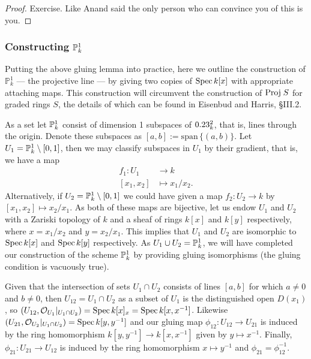 \begin{proof}
Exercise. Like Anand said the only person who can convince you of this is you.
\end{proof}

\subsubsection{Constructing $\P_k^1$}

Putting the above gluing lemma into practice, here we outline the construction of $\mathbb{P}_k^1$ --- the projective line --- by giving two copies of $\Spec k[x]$ with appropriate attaching maps. This construction will circumvent the construction of $\textnormal{Proj}\; S$ for graded rings $S$, the details of which can be found in Eisenbud and Harris, \S III.2.

As a set let $\P_k^1$ consist of dimension 1 subspaces of $\A_k^2$, that is, lines through the origin. Denote these subspaces as $[a,b] := \text{span}\, \{(a,b)\}$. Let $U_1 = \P_k^1 \setminus [0,1]$, then we may classify subspaces in $U_1$ by their gradient, that is, we have a map 
\begin{align*}
f_1 \colon U_1 &\to k\\
[x_1, x_2] &\mapsto x_1/x_2.
\end{align*}
Alternatively, if $U_2 = \P_k^1 \setminus [0,1]$ we could have given a map $f_2 \colon U_2 \to k$ by $[x_1, x_2] \mapsto x_2/x_1$. As both of these maps are bijective, let us endow $U_1$ and $U_2$ with a Zariski topology of $k$ and a sheaf of rings $k[x]$ and $k[y]$ respectively, where $x = x_1/x_2$ and $y = x_2/x_1$. This implies that $U_1$ and $U_2$ are isomorphic to $\Spec k[x]$ and $\Spec k[y]$ respectively. As $U_1 \cup U_2 = \P_k^1$, we will have completed our construction of the scheme $\P_k^1$ by providing gluing isomorphisms (the gluing condition is vacuously true).

Given that the intersection of sets $U_1 \cap U_2$ consists of lines $[a,b]$ for which $a \ne 0$ and $b \ne 0$, then $U_{12} = U_1 \cap U_2$ as a subset of $U_1$ is the distinguished open $D(x_1)$, so $(U_{12}, \mathcal{O}_{U_1}|_{U_1 \cap U_2}) = \Spec k[x]_{x} = \Spec k[x, x^{-1}]$.
Likewise $(U_{21}, \mathcal{O}_{U_2}|_{U_1 \cap U_2}) = \Spec k[y, y^{-1}]$
and our gluing map ${\phi_{12} \colon U_{12} \to U_{21}}$ is induced by the ring homomorphism $k[y, y^{-1}] \to k[x, x^{-1}]$ given by $y \mapsto x^{-1}$. Finally, $\phi_{21} \colon U_{21} \to U_{12}$ is induced by the ring homomorphism $x \mapsto y^{-1}$ and $\phi_{21} = \phi_{12}^{-1}$.

